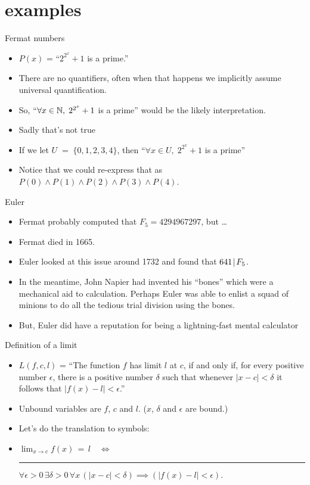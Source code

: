 \documentclass[landscape]{beamer}
\begin{document}
\section{examples}

\begin{frame}{Fermat numbers}
\begin{itemize}
\item $P(x)$ = ``$2^{2^x}+1$ is a prime.'' \pause
\item There are no quantifiers, often when that happens we implicitly assume universal quantification.\pause
\item So, ``$\forall x \in {\mathbb N}, \; 2^{2^x}+1$ is a prime'' would be the likely interpretation.\pause
\item Sadly that's not true \pause
\item If we let $U \; = \; \{0,1,2,3,4\}$, then ``$\forall x \in U, \; 2^{2^x}+1$ is a prime'' \pause
\item Notice that we could re-express that as $P(0) \land P(1) \land P(2) \land P(3) \land P(4)$.
\end{itemize}
\end{frame}

\begin{frame}{Euler}
\begin{itemize}
\item Fermat probably computed that $F_5=4294967297$, but \ldots \pause
\item Fermat died in 1665. \pause
\item Euler looked at this issue around 1732 and found that $641 \!\mid\! F_5$. \pause
\item In the meantime, John Napier had invented his ``bones'' which were a mechanical aid to calculation.  Perhaps Euler was able to enlist a squad of minions to do all the tedious trial division using the bones. \pause
\item But, Euler did have a reputation for being a lightning-fast mental calculator\textellipsis
\end{itemize}
\end{frame}

\begin{frame}{Definition of a limit}
\begin{itemize}
\item $L(f,c,l)$ = ``The function $f$ has limit $l$ at $c$, if 
and only if, 
for every positive number $\epsilon$, there is a positive number $\delta$ 
such that whenever $|x-c| < \delta$ it follows that $|f(x)-l| < \epsilon$.''  \pause
\item Unbound variables are $f$, $c$ and $l$. \pause ($x$, $\delta$ and $\epsilon$ are bound.)\pause
\item Let's do the translation to symbols:\pause
\item $ \lim_{x\rightarrow c} f(x) \, = \, l \quad \iff $ \newline
\rule{72pt}{0pt} $\forall \epsilon>0 \, \exists \delta>0 \, \forall x \, (|x-c| < \delta) \implies (|f(x)-l| < \epsilon).$
\end{itemize}
\end{frame}
\end{document}
